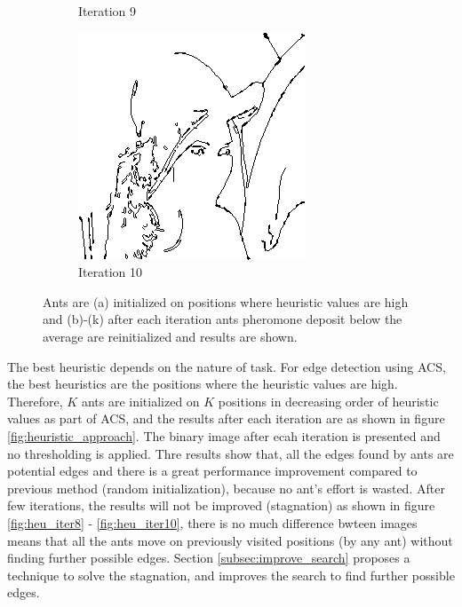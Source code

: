 \documentclass{llncs}
\begin{document}
\begin{figure}
\begin{subfigure}[b]{0.3\textwidth}
                \caption{Iteration 9}
                \label{fig:search_iter9}
        \end{subfigure}
        \quad
        \begin{subfigure}[b]{0.3\textwidth}
                \includegraphics[width=\textwidth]{IMG/ImprovedSearch/Iteration10}
                \caption{Iteration 10}
                \label{fig:search_iter10}
        \end{subfigure}
        \caption{Ants are (a) initialized on positions where heuristic values are high and (b)-(k) after each iteration ants pheromone deposit below the average are reinitialized and results are shown.}\label{fig:search_improved}
	\end{figure}
	
	The best heuristic depends on the nature of task. For edge detection using ACS, the best heuristics are the positions where the heuristic values are high. Therefore, $K$ ants are initialized on $K$ positions in decreasing order of heuristic values as part of ACS, and the results after each iteration are as shown in figure \ref{fig:heuristic_approach}. The binary image after ecah iteration is presented and no thresholding is applied. Thre results show that, all the edges found by ants are potential edges and there is a great performance improvement compared to previous method (random initialization), because no ant's effort is wasted. After few iterations, the results will not be improved (stagnation) as shown in figure \ref{fig:heu_iter8} - \ref{fig:heu_iter10}, there is no much difference bwteen images means that all the ants move on previously visited positions (by any ant) without finding further possible edges. Section \ref{subsec:improve_search} proposes a technique to solve the stagnation, and improves the search to find further possible edges.
	
\end{document}
